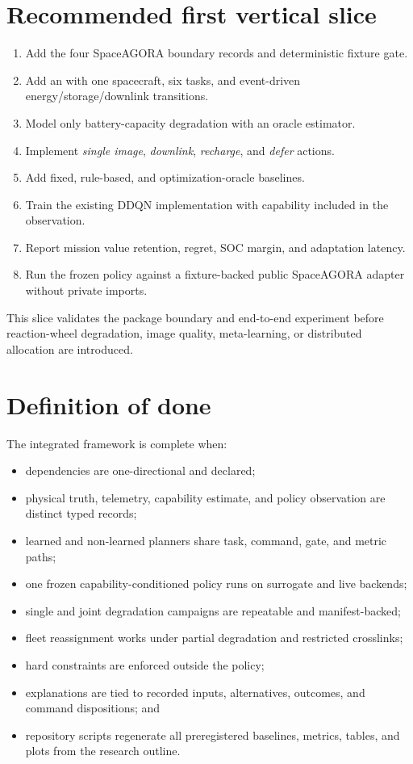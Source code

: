 \documentclass[11pt]{article}
\newcommand{\code}[1]{\texttt{\detokenize{#1}}}
\begin{document}
\section{Recommended first vertical slice}

\begin{enumerate}
  \item Add the four SpaceAGORA boundary records and deterministic fixture gate.
  \item Add an \code{EarthObservationMDP} with one spacecraft, six tasks, and
        event-driven energy/storage/downlink transitions.
  \item Model only battery-capacity degradation with an oracle estimator.
  \item Implement \emph{single image}, \emph{downlink}, \emph{recharge}, and
        \emph{defer} actions.
  \item Add fixed, rule-based, and optimization-oracle baselines.
  \item Train the existing DDQN implementation with capability included in the
        observation.
  \item Report mission value retention, regret, SOC margin, and adaptation
        latency.
  \item Run the frozen policy against a fixture-backed public SpaceAGORA
        adapter without private imports.
\end{enumerate}

This slice validates the package boundary and end-to-end experiment before
reaction-wheel degradation, image quality, meta-learning, or distributed
allocation are introduced.

\section{Definition of done}

The integrated framework is complete when:

\begin{itemize}
  \item dependencies are one-directional and declared;
  \item physical truth, telemetry, capability estimate, and policy observation
        are distinct typed records;
  \item learned and non-learned planners share task, command, gate, and metric
        paths;
  \item one frozen capability-conditioned policy runs on surrogate and live
        backends;
  \item single and joint degradation campaigns are repeatable and
        manifest-backed;
  \item fleet reassignment works under partial degradation and restricted
        crosslinks;
  \item hard constraints are enforced outside the policy;
  \item explanations are tied to recorded inputs, alternatives, outcomes, and
        command dispositions; and
  \item repository scripts regenerate all preregistered baselines, metrics,
        tables, and plots from the research outline.
\end{itemize}
\end{document}
